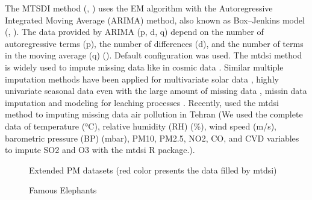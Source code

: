 \documentclass[
  number]{elsarticle}
\begin{document}
The MTSDI method (\citep{junger2003missing}, \citep{junger2012mtsdi})
uses the EM algorithm with the Autoregressive Integrated Moving Average
(ARIMA) method, also known as Box--Jenkins model (\citep{box2015time},
\citep{meyler1998forecasting}). The data provided by ARIMA (p, d, q)
depend on the number of autoregressive terms (p), the number of
differences (d), and the number of terms in the moving average (q)
(\citep{meyler1998forecasting}). Default configuration was used. The
mtdsi method is widely used to impute missing data like in cosmic data
\citep{fernandes2017data}. Similar multiple imputation methods have been
applied for multivariate solar data \citep{zhang2020solargan}, highly
univariate seasonal data even with the large amount of missing data
\citep{chaudhry2019method}, missin data imputation and modeling for
leaching processes \citep{he2017study}. Recently,
\citep{motesaddi2022effects} used the mtdsi method to imputing missing
data air pollution in Tehran (We used the complete data of temperature
(°C), relative humidity (RH) (\%), wind speed (m/s), barometric pressure
(BP) (mbar), PM10, PM2.5, NO2, CO, and CVD variables to impute SO2 and
O3 with the mtdsi R package.).

\begin{figure}


\caption{\label{fig-2}Extended PM datasets (red color presents the data
filled by mtdsi)}

\end{figure}%

\begin{figure}

\begin{minipage}{0.50\linewidth}



\end{minipage}%
%
\begin{minipage}{0.50\linewidth}



\end{minipage}%

\caption{\label{fig-elephants}Famous Elephants}

\end{figure}%
\end{document}
